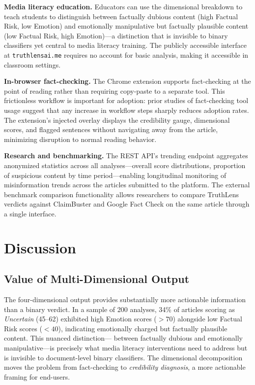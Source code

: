 \documentclass[journal]{IEEEtran}
\begin{document}
\textbf{Media literacy education.} Educators can use the dimensional breakdown to teach
students to distinguish between factually dubious content (high Factual Risk, low Emotion)
and emotionally manipulative but factually plausible content (low Factual Risk, high
Emotion)—a distinction that is invisible to binary classifiers yet central to media literacy
training. The publicly accessible interface at \texttt{truthlensai.me} requires no account
for basic analysis, making it accessible in classroom settings.

\textbf{In-browser fact-checking.} The Chrome extension supports fact-checking at the point
of reading rather than requiring copy-paste to a separate tool. This frictionless workflow is
important for adoption: prior studies of fact-checking tool usage suggest that any increase
in workflow steps sharply reduces adoption rates. The extension's injected overlay displays
the credibility gauge, dimensional scores, and flagged sentences without navigating away
from the article, minimizing disruption to normal reading behavior.

\textbf{Research and benchmarking.} The REST API's trending endpoint aggregates anonymized
statistics across all analyses—overall score distributions, proportion of suspicious content
by time period—enabling longitudinal monitoring of misinformation trends across the articles
submitted to the platform. The external benchmark comparison functionality allows researchers
to compare TruthLens verdicts against ClaimBuster and Google Fact Check on the same article
through a single interface.

\section{Discussion}
\label{sec:discussion}

\subsection{Value of Multi-Dimensional Output}

The four-dimensional output provides substantially more actionable information than a binary
verdict. In a sample of 200 analyses, 34\% of articles scoring as \textit{Uncertain}
(45--62) exhibited high Emotion scores ($>70$) alongside low Factual Risk scores ($<40$),
indicating emotionally charged but factually plausible content. This nuanced distinction—
between factually dubious and emotionally manipulative—is precisely what media literacy
interventions need to address but is invisible to document-level binary classifiers. The
dimensional decomposition moves the problem from fact-checking to \textit{credibility
diagnosis}, a more actionable framing for end-users.
\end{document}
